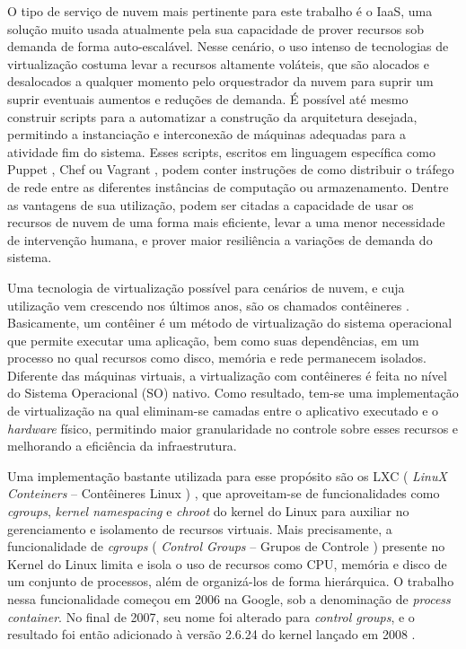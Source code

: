 O tipo de serviço de nuvem mais pertinente para este trabalho é o IaaS, uma solução muito usada atualmente pela sua capacidade de prover recursos sob demanda de forma auto-escalável.
%
Nesse cenário, o uso intenso de tecnologias de virtualização costuma levar a recursos altamente voláteis, que são alocados e desalocados a qualquer momento pelo orquestrador da nuvem para suprir um suprir eventuais aumentos e reduções de demanda.
%
É possível até mesmo construir scripts para a automatizar a construção da arquitetura desejada, permitindo a instanciação e interconexão de máquinas adequadas para a atividade fim do sistema.
%
Esses scripts, escritos em linguagem específica como Puppet \cite{Puppet2018}, Chef \cite{Chef2018} ou Vagrant \cite{Vagrant2018}, podem conter instruções de como distribuir o tráfego de rede entre as diferentes instâncias de computação ou armazenamento.
%
Dentre as vantagens de sua utilização, podem ser citadas a capacidade de usar os recursos de nuvem de uma forma mais eficiente, levar a uma menor necessidade de intervenção humana, e prover maior resiliência a variações de demanda do sistema.



Uma tecnologia de virtualização possível para cenários de nuvem, e cuja utilização vem crescendo nos últimos anos, são os chamados contêineres \cite{containers-tech:2014}. 
%
Basicamente, um contêiner é um método de virtualização do sistema operacional que permite executar uma aplicação, bem como suas dependências, em um processo no qual recursos como disco, memória e rede permanecem isolados.
%
Diferente das máquinas virtuais, a virtualização com contêineres é feita no nível do Sistema Operacional (SO) nativo.
%
Como resultado, tem-se uma implementação de virtualização na qual eliminam-se camadas entre o aplicativo executado e o \textit{hardware} físico, permitindo maior granularidade no controle sobre esses recursos e melhorando a eficiência da infraestrutura.


Uma implementação bastante utilizada para esse propósito são os LXC ( \textit{LinuX Conteiners} -- Contêineres Linux ) \cite{Linuxcontainers.org2015}, que aproveitam-se de funcionalidades como \textit{cgroups}, \textit{kernel namespacing} e \textit{chroot} do kernel do Linux para auxiliar no gerenciamento e isolamento de recursos virtuais.
%
Mais precisamente, a funcionalidade de \textit{cgroups} ( \textit{Control Groups} -- Grupos de Controle ) presente no Kernel do Linux limita e isola o uso de recursos como CPU, memória e disco de um conjunto de processos, além de organizá-los de forma hierárquica. 
%
O trabalho nessa funcionalidade começou em 2006 na Google, sob a denominação de \textit{process container}. 
%
No final de 2007, seu nome foi alterado para \textit{control groups}, e o resultado foi então adicionado à versão 2.6.24 do kernel lançado em 2008 \cite{UnixManPagesControlGroups}.

